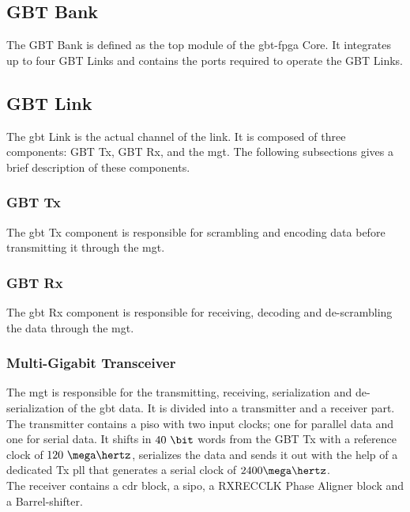 \documentclass[main.tex]{subfiles}
\begin{document}
\subsection{GBT Bank}
The GBT Bank is defined as the top module of the \gls{gbt}-\gls{fpga} Core. It integrates up to four GBT Links and contains the ports required to operate the GBT Links.

\subsection{GBT Link}
The \gls{gbt} Link is the actual channel of the link. It is composed of three components: GBT Tx, GBT Rx, and the \gls{mgt}. The following subsections gives a brief description of these components.

\subsubsection{GBT Tx}

The \gls{gbt} Tx component is responsible for scrambling and encoding data before transmitting it through the \gls{mgt}.

\subsubsection{GBT Rx}

The \gls{gbt} Rx component is responsible for receiving, decoding and de-scrambling the data through the \gls{mgt}.

\subsubsection{Multi-Gigabit Transceiver}
The \gls{mgt} is responsible for the transmitting, receiving, serialization and de-serialization of the \gls{gbt} data. It is divided into a transmitter and a receiver part.\\ The transmitter contains a \gls{piso} with two input clocks; one for parallel data and one for serial data. It shifts in $40~\bit$ words from the GBT Tx with a reference clock of $120~\mega\hertz$, serializes the data and sends it out with the help of a dedicated Tx \gls{pll} that generates a serial clock of $2400 \mega\hertz$.\\ The receiver contains a \gls{cdr} block, a \gls{sipo}, a RXRECCLK Phase Aligner block and a Barrel-shifter. 



\end{document}
